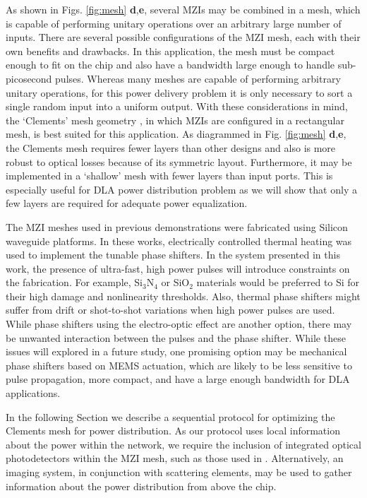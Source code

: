 As shown in Figs. \ref{fig:mesh} \textbf{d},\textbf{e}, several MZIs may be combined in a mesh, which is capable of performing unitary operations over an arbitrary large number of inputs.  There are several possible configurations of the MZI mesh, each with their own benefits and drawbacks.  In this application, the mesh must be compact enough to fit on the chip and also have a bandwidth large enough to handle sub-picosecond pulses.  Whereas many meshes are capable of performing arbitrary unitary operations, for this power delivery problem it is only necessary to sort a single random input into a uniform output.  With these considerations in mind, the `Clements' mesh geometry \cite{clements_optimal_2016}, in which MZIs are configured in a rectangular mesh, is best suited for this application.   As diagrammed in Fig. \ref{fig:mesh} \textbf{d},\textbf{e}, the Clements mesh requires fewer layers than other designs \cite{reck_experimental_1994} and also is more robust to optical losses because of its symmetric layout.  Furthermore, it may be implemented in a `shallow' mesh with fewer layers than input ports.  This is especially useful for DLA power distribution problem as we will show that only a few layers are required for adequate power equalization.  %

The MZI meshes used in previous demonstrations \cite{annoni_unscrambling_2017, shen_deep_2017} were fabricated using Silicon waveguide platforms.  In these works, electrically controlled thermal heating was used to implement the tunable phase shifters.  In the system presented in this work, the presence of ultra-fast, high power pulses will introduce constraints on the fabrication.  For example, Si$_3$N$_4$ or SiO$_2$ materials would be preferred to Si for their high damage and nonlinearity thresholds.  Also, thermal phase shifters might suffer from drift or shot-to-shot variations when high power pulses are used.  While phase shifters using the electro-optic effect are another option, there may be unwanted interaction between the pulses and the phase shifter.  While these issues will explored in a future study, one promising option may be mechanical phase shifters \cite{han2015large} based on MEMS actuation, which are likely to be less sensitive to pulse propagation, more compact, and have a large enough bandwidth for DLA applications.

In the following Section we describe a sequential protocol for optimizing the Clements mesh for power distribution. As our protocol uses local information about the power within the network, we require the inclusion of integrated optical photodetectors within the MZI mesh, such as those used in \cite{annoni_unscrambling_2017}.  Alternatively, an imaging system, in conjunction with scattering elements, may be used to gather information about the power distribution from above the chip.

